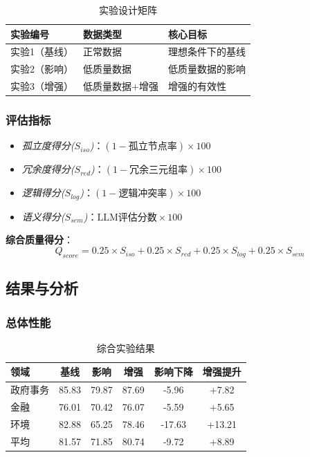 \documentclass[runningheads]{llncs}
\begin{document}
\begin{table}[H]
    \centering
    \caption{实验设计矩阵}
    \label{tab:exp_design}
    \begin{tabularx}{\textwidth}{p{2.5cm} p{1.5cm} X}
    \toprule
    实验编号 & 数据类型 & 核心目标 \\
    \midrule
    实验1（基线） & 正常数据 & 理想条件下的基线 \\
    实验2（影响） & 低质量数据 & 低质量数据的影响 \\
    实验3（增强） & 低质量数据+增强 & 增强的有效性 \\
    \bottomrule
    \end{tabularx}
\end{table}

\subsubsection{评估指标}
\begin{itemize}
    \item \textit{孤立度得分($S_{iso}$)}：$(1 - \text{孤立节点率}) \times 100$
    \item \textit{冗余度得分($S_{red}$)}：$(1 - \text{冗余三元组率}) \times 100$
    \item \textit{逻辑得分($S_{log}$)}：$(1 - \text{逻辑冲突率}) \times 100$
    \item \textit{语义得分($S_{sem}$)}：$\text{LLM评估分数} \times 100$
\end{itemize}

\noindent \textbf{综合质量得分}：
$$Q_{score} = 0.25 \times S_{iso} + 0.25 \times S_{red} + 0.25 \times S_{log} + 0.25 \times S_{sem}$$

\subsection{结果与分析}

\subsubsection{总体性能}

\begin{table}[H]
    \centering
    \caption{综合实验结果}
    \label{tab:comprehensive_results}
    \begin{tabularx}{\textwidth}{l c c c c c}
    \toprule
    领域 & 基线 & 影响 & 增强 & 影响下降 & 增强提升 \\
    \midrule
    政府事务 & 85.83 & 79.87 & 87.69 & -5.96 & +7.82 \\
    金融 & 76.01 & 70.42 & 76.07 & -5.59 & +5.65 \\
    环境 & 82.88 & 65.25 & 78.46 & -17.63 & +13.21 \\
    \midrule
    平均 & 81.57 & 71.85 & 80.74 & -9.72 & +8.89 \\
    \bottomrule
    \end{tabularx}
\end{table}
\end{document}
